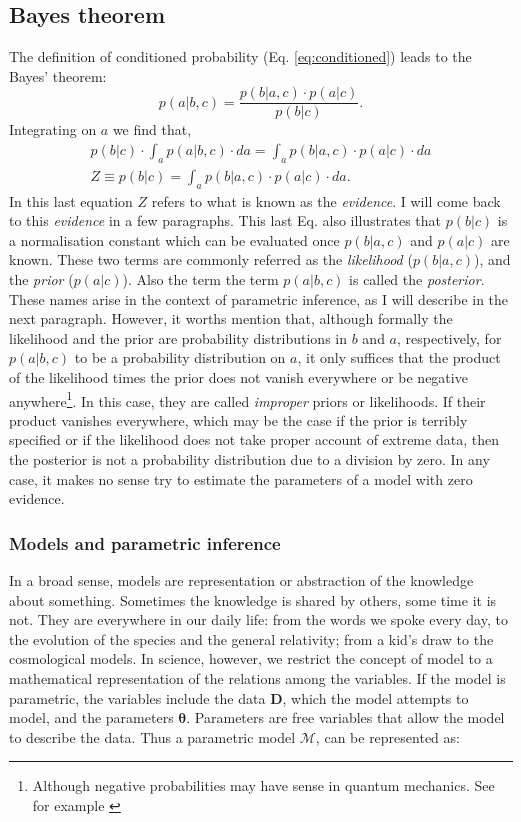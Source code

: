 \subsection{Bayes theorem}
The definition of conditioned probability (Eq. \ref{eq:conditioned}) leads to the Bayes' theorem:
\begin{equation}
p(a|b,c) = \frac{p(b|a,c)\cdot p(a|c)}{p(b|c)}.
\end{equation}
Integrating on $a$ we find that,
\begin{align}
\label{eq:evidence}
p(b|c) \cdot \int_a p(a|b,c)\cdot da = \int_a p(b|a,c) \cdot p(a|c) \cdot da \nonumber \\
Z \equiv p(b|c) = \int_a p(b|a,c) \cdot p(a|c) \cdot da.
\end{align}
In this last equation $Z$ refers to what is known as the \emph{evidence}. I will come back to this \emph{evidence} in a few paragraphs. This last Eq. also illustrates that $p(b|c)$ is a normalisation constant which can be evaluated once $p(b|a,c)$ and $p(a|c)$ are known. These two terms are commonly referred as the \emph{likelihood}  ($p(b|a,c)$), and the \emph{prior} ($p(a|c)$). Also the term the term $p(a|b,c)$ is called the \emph{posterior}. These names arise in the context of parametric inference, as I will describe in the next paragraph. However, it worths mention that, although formally the likelihood and the prior are probability distributions in $b$ and $a$, respectively, for $p(a|b,c)$ to be a probability distribution on $a$, it only suffices that the product of the likelihood times the prior does not vanish everywhere or be negative anywhere\footnote{Although negative probabilities may have sense in quantum mechanics. See for example \citet{1942RSPSA.180....1D}}. In this case, they are called \emph{improper} priors or likelihoods. If their product vanishes everywhere, which may be the case if the prior is terribly specified or if the likelihood does not take proper account of extreme data, then the posterior is not a probability distribution due to a division by zero. In any case, it makes no sense try to estimate the parameters of a model with zero evidence.

\subsubsection{Models and parametric inference}
In a broad sense, models are representation or abstraction of the knowledge about something. Sometimes the knowledge is shared by others, some time it is not. They are everywhere in our daily life: from the words we spoke every day, to the evolution of the species and the general relativity; from a kid's draw to the cosmological models. In science, however, we restrict the concept of model to a mathematical representation of the relations among the variables. If the model is parametric, the variables include the data $\mathbf{D}$, which the model attempts to model, and the parameters $\mathbf{\theta}$. Parameters are free variables that allow the model to describe the data. Thus a parametric model $\mathcal{M}$, can be represented as:

